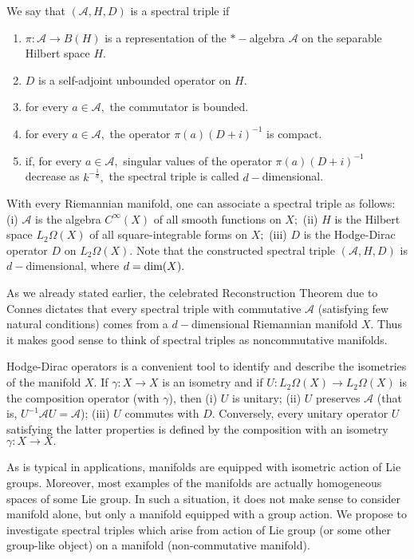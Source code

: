 \documentclass{article}
\begin{document}
We say that $(\mathcal{A},H,D)$ is a spectral triple if
\begin{enumerate}
\item $\pi:\mathcal{A}\to B(H)$ is a representation of the $\ast-$algebra $\mathcal{A}$ on the separable Hilbert space $H.$
\item $D$ is a self-adjoint unbounded operator on $H.$
\item for every $a\in\mathcal{A},$ the commutator is bounded.
\item for every $a\in\mathcal{A},$ the operator $\pi(a)(D+i)^{-1}$ is compact.
\item if, for every $a\in\mathcal{A},$ singular values of the operator $\pi(a)(D+i)^{-1}$ decrease as $k^{-\frac1d},$ the spectral triple is called $d-$dimensional.
\end{enumerate}

With every Riemannian manifold, one can associate a spectral triple as follows: (i) $\mathcal{A}$ is the algebra $C^{\infty}(X)$ of all smooth functions on $X;$ (ii) $H$ is the Hilbert space $L_2\Omega(X)$ of all square-integrable forms on $X;$ (iii) $D$ is the Hodge-Dirac operator $D$ \cite{BGV} on $L_2\Omega(X).$ Note that the constructed spectral triple $(\mathcal{A},H,D)$ is $d-$dimensional, where $d={\rm dim}(X).$

As we already stated earlier, the celebrated Reconstruction Theorem due to Connes \cite{Connes-reconstruction} dictates that every spectral triple with commutative $\mathcal{A}$ (satisfying few natural conditions) comes from a $d-$dimensional Riemannian manifold $X.$ Thus it makes good sense to think of spectral triples as noncommutative manifolds.


Hodge-Dirac operators is a convenient tool to identify and describe the isometries of the manifold $X.$ If $\gamma:X\to X$ is an isometry and if $U:L_2\Omega(X)\to L_2\Omega(X)$ is the composition operator (with $\gamma$), then (i) $U$ is unitary; (ii) $U$ preserves $\mathcal{A}$ (that is, $U^{-1}\mathcal{A}U=\mathcal{A}$); (iii) $U$ commutes with $D.$ Conversely, every unitary operator $U$ satisfying the latter properties is defined by the composition with an isometry $\gamma:X\to X.$

As is typical in applications, manifolds are equipped with isometric action of Lie groups. Moreover, most examples of the manifolds are actually homogeneous spaces of some Lie group.  In such a situation, it does not make sense to consider manifold alone, but only a manifold equipped with a group action. We propose to investigate spectral triples which arise from action of Lie group (or some other group-like object) on a manifold (non-commutative manifold).
\end{document}
